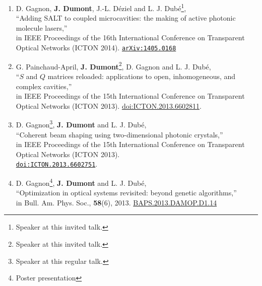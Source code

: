 \begin{enumerate}
 \item[\cite{GAG2014b}] D. Gagnon, \textbf{J. Dumont}, J.-L. Déziel and L. J. Dubé\footnote{Speaker at this invited talk.}, \\
	``Adding SALT to coupled microcavities: the making of active photonic molecule lasers,''\\
	in IEEE Proceedings of the 16th International Conference on Transparent Optical Networks (ICTON 2014).
	\href{http://arxiv.org/abs/1405.0168}{\texttt{arXiv:1405.0168}}
 \item[\cite{GAP2013b}] G. Painchaud-April, \textbf{J. Dumont}\footnote{Speaker at this invited talk.}, D. Gagnon and L. J. Dubé, \\
	``$S$ and $Q$ matrices reloaded: applications to open, inhomogeneous, and complex cavities,''\\
	in IEEE Proceedings of the 15th International Conference on Transparent Optical Networks (ICTON 2013).
	\href{http://dx.doi.org/10.1109/ICTON.2013.6602811}{doi:ICTON.2013.6602811}.
 \item[\cite{GAG2013a}] D. Gagnon\footnote{Speaker at this regular talk.}, \textbf{J. Dumont} and L. J. Dubé, \\
	``Coherent beam shaping using two-dimensional photonic crystals,''\\
	in IEEE Proceedings of the 15th International Conference on Transparent Optical Networks (ICTON 2013).\\
	\href{http://dx.doi.org/10.1109/ICTON.2013.6602751}{\texttt{doi:ICTON.2013.6602751}}.
 \item[\cite{GAG2013b}] D. Gagnon\footnote{Poster presentation}, \textbf{J. Dumont} and L. J. Dubé, \\
	``Optimization in optical systems revisited: beyond genetic algorithms,''\\
	in Bull. Am. Phys. Soc., \textbf{58}(6), 2013. \href{http://meetings.aps.org/link/BAPS.2013.DAMOP.D1.14}{BAPS.2013.DAMOP.D1.14}
\end{enumerate}


